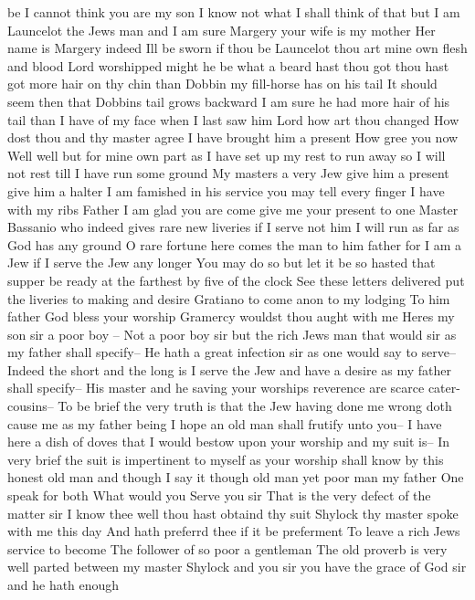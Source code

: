 be 
I cannot think you are my son 
I know not what I shall think of that but I am 
Launcelot the Jews man and I am sure Margery your 
wife is my mother 
Her name is Margery indeed Ill be sworn if thou 
be Launcelot thou art mine own flesh and blood 
Lord worshipped might he be what a beard hast thou 
got thou hast got more hair on thy chin than 
Dobbin my fill-horse has on his tail 
It should seem then that Dobbins tail grows 
backward I am sure he had more hair of his tail 
than I have of my face when I last saw him 
Lord how art thou changed How dost thou and thy 
master agree I have brought him a present How 
gree you now 
Well well but for mine own part as I have set 
up my rest to run away so I will not rest till I 
have run some ground My masters a very Jew give 
him a present give him a halter I am famished in 
his service you may tell every finger I have with 
my ribs Father I am glad you are come give me 
your present to one Master Bassanio who indeed 
gives rare new liveries if I serve not him I 
will run as far as God has any ground O rare 
fortune here comes the man to him father for I 
am a Jew if I serve the Jew any longer 
You may do so but let it be so hasted that supper 
be ready at the farthest by five of the clock See 
these letters delivered put the liveries to making 
and desire Gratiano to come anon to my lodging 
To him father 
God bless your worship 
Gramercy wouldst thou aught with me 
Heres my son sir a poor boy -- 
Not a poor boy sir but the rich Jews man that 
would sir as my father shall specify-- 
He hath a great infection sir as one would say to serve-- 
Indeed the short and the long is I serve the Jew 
and have a desire as my father shall specify-- 
His master and he saving your worships reverence 
are scarce cater-cousins-- 
To be brief the very truth is that the Jew having 
done me wrong doth cause me as my father being I 
hope an old man shall frutify unto you-- 
I have here a dish of doves that I would bestow upon 
your worship and my suit is-- 
In very brief the suit is impertinent to myself as 
your worship shall know by this honest old man and 
though I say it though old man yet poor man my father 
One speak for both What would you 
Serve you sir 
That is the very defect of the matter sir 
I know thee well thou hast obtaind thy suit 
Shylock thy master spoke with me this day 
And hath preferrd thee if it be preferment 
To leave a rich Jews service to become 
The follower of so poor a gentleman 
The old proverb is very well parted between my 
master Shylock and you sir you have the grace of 
God sir and he hath enough 
